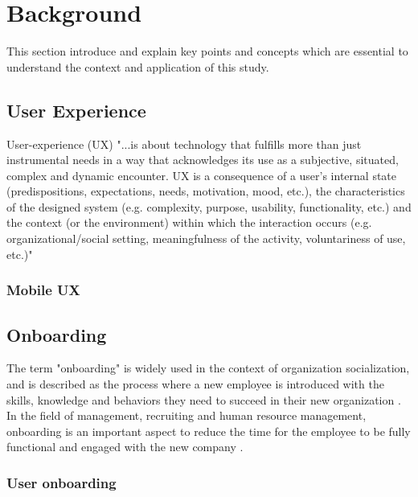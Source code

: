 \chapter{Background}
\label{chap:background}
This section introduce and explain key points and concepts which are essential to understand the context and application of this study.

\section{User Experience}
User-experience (UX) "...is about technology that fulfills more than just instrumental needs in a way that acknowledges its use as a subjective, situated, complex and dynamic encounter. UX is a consequence of a user’s internal state (predispositions, expectations, needs, motivation, mood, etc.), the characteristics of the designed system (e.g. complexity, purpose, usability, functionality, etc.) and the context (or the environment) within which the interaction occurs (e.g. organizational/social setting, meaningfulness of the activity, voluntariness of use, etc.)" \cite{Hassenzahl2006}

\subsection{Mobile UX}

\section{Onboarding}
The term "onboarding" is widely used in the context of organization socialization, and is described as the process where a new employee is introduced with the skills, knowledge and behaviors they need to succeed in their new organization \cite{Bauer2011}. In the field of management, recruiting and human resource management, onboarding is an important aspect to reduce the time for the employee to be fully functional and engaged with the new company \cite{GraybillJolieO;HudsonCarpenterMariaTaesil;OffordJeromeJr;PiorunMary;Shaffer2013}.

\subsection{User onboarding}
